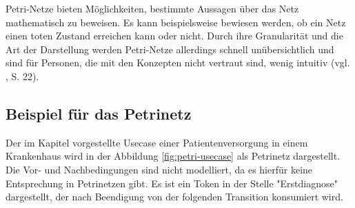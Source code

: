 Petri-Netze bieten Möglichkeiten, bestimmte Aussagen über das Netz mathematisch zu beweisen. Es kann beispielsweise bewiesen werden, ob ein Netz einen toten Zustand erreichen kann oder nicht. Durch ihre Granularität und die Art der Darstellung werden Petri-Netze allerdings schnell unübersichtlich und sind für Personen, die mit den Konzepten nicht vertraut sind, wenig intuitiv (vgl. \citep{BernroiderStix2006}, S. 22).


\subsection{Beispiel für das Petrinetz }
Der im Kapitel  vorgestellte Usecase einer Patientenversorgung in einem Krankenhaus wird in der Abbildung \ref{fig:petri-usecase} als Petrinetz dargestellt. Die Vor- und Nachbedingungen sind nicht modelliert, da es hierfür keine Entsprechung in Petrinetzen gibt. Es ist ein Token in der Stelle "Erstdiagnose" dargestellt, der nach Beendigung von der folgenden Transition konsumiert wird.



